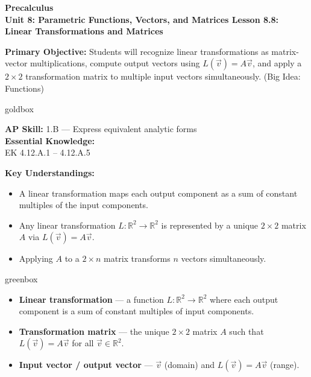 \documentclass[10pt]{article}
\newcommand{\CourseName}{Precalculus}
\newcommand{\UnitNumberName}{Unit 8: Parametric Functions, Vectors, and Matrices \quad}
\newcommand{\LessonNumberName}{Lesson 8.8: Linear Transformations and Matrices}
\begin{document}
\begin{center}
    {\Large\bfseries \CourseName \\
    {\small\bfseries \UnitNumberName \LessonNumberName}}
\end{center}

\begin{tcolorbox}[colback=sky, colframe=navy, boxrule=0.9pt, arc=2mm,
    left=2mm, right=2mm, top=1.5mm, bottom=1.5mm]
    \textbf{Primary Objective:} Students will recognize linear transformations as
    matrix-vector multiplications, compute output vectors using $L(\vec{v}) = A\vec{v}$,
    and apply a $2\times 2$ transformation matrix to multiple input vectors simultaneously.
    (Big Idea: Functions)
\end{tcolorbox}

\renewcommand{\arraystretch}{1.6}
\begin{skillbox}{goldbox}
\begin{minipage}[t]{0.46\linewidth}\vspace{0pt}
    \textbf{AP Skill:} 1.B --- Express equivalent analytic forms\\[4pt]
    \textbf{Essential Knowledge:}\\
    EK 4.12.A.1 -- 4.12.A.5
\end{minipage}
\hfill
\begin{minipage}[t]{0.50\linewidth}\vspace{0pt}
    \textbf{Key Understandings:}
    \begin{itemize}[leftmargin=1.2em, itemsep=1pt]
        \item A linear transformation maps each output component as a sum of constant
              multiples of the input components.
        \item Any linear transformation $L:\mathbb{R}^2\to\mathbb{R}^2$ is represented
              by a unique $2\times 2$ matrix $A$ via $L(\vec{v})=A\vec{v}$.
        \item Applying $A$ to a $2\times n$ matrix transforms $n$ vectors simultaneously.
    \end{itemize}
\end{minipage}
\end{skillbox}

\begin{skillbox}{greenbox}
\begin{itemize}[leftmargin=1.2em, itemsep=2pt]
    \item \textbf{Linear transformation} --- a function $L:\mathbb{R}^2\to\mathbb{R}^2$
          where each output component is a sum of constant multiples of input components.
    \item \textbf{Transformation matrix} --- the unique $2\times 2$ matrix $A$ such that
          $L(\vec{v})=A\vec{v}$ for all $\vec{v}\in\mathbb{R}^2$.
    \item \textbf{Input vector / output vector} --- $\vec{v}$ (domain) and $L(\vec{v})=A\vec{v}$
          (range).
\end{itemize}
\end{skillbox}
\end{document}
